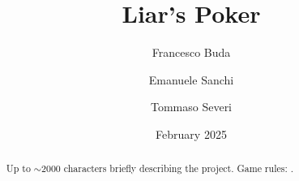 \documentclass{scrartcl}
\title{\LARGE
    Liar's Poker
}
\author{
    Francesco Buda \\ \emailaddr{francesco.buda3@studio.unibo.it}
    \and
    Emanuele Sanchi \\ \emailaddr{emanuele.sanchi@studio.unibo.it}
    \and
    Tommaso Severi \\ \emailaddr{tommaso.severi2@studio.unibo.it}
}
\date{February 2025}
\begin{document}
\maketitle

\begin{abstract}
      Up to $\sim$2000 characters briefly describing the project.
      Game rules: \cite{gamerules}.
\end{abstract}

\clearpage

\tableofcontents

\clearpage

\end{document}
